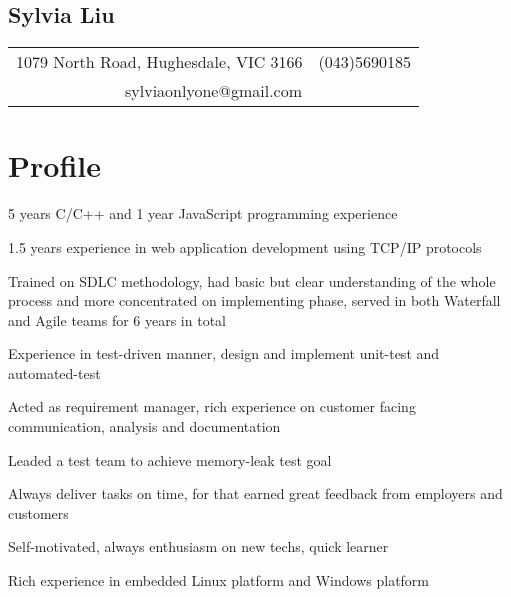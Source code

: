 \documentclass[a4paper,11pt]{article}
\begin{document}
\begin{comment}
This is cover letter field.
\end{comment}


\begin{center}
  \section*{Sylvia Liu}
  \begin{tabular}{l r}
    1079 North Road, Hughesdale, VIC 3166 & (043)5690185 \\
    \multicolumn{2}{c}{sylviaonlyone@gmail.com} \\
  \end{tabular}
\end{center}

\begin{comment}
\begin{tabular}{l l}
  Mobile:  & 0435690185 \\
  E-mail:  & sylviaonlyone@gmail.com \\
  Address: & Hughesdale, VIC 3166 \\
  \multicolumn{2}{l}{Australia Permanent Resident, 175 visa holder} \\
\end{tabular}
\end{comment}

\section*{Profile}
\begin{itemize*}
    \setlength\itemsep{0.4em}
  \item 5 years C/C++ and 1 year JavaScript programming experience
  \item 1.5 years experience in web application development using TCP/IP protocols
  \item Trained on SDLC methodology, had basic but clear understanding of the whole process and more concentrated on implementing phase, served in both Waterfall and Agile teams for 6 years in total
  \item Experience in test-driven manner, design and implement unit-test and automated-test
  \item Acted as requirement manager, rich experience on customer facing communication, analysis and documentation
  \item Leaded a test team to achieve memory-leak test goal
  \item Always deliver tasks on time, for that earned great feedback from employers and customers
  \item Self-motivated, always enthusiasm on new techs, quick learner
  \item Rich experience in embedded Linux platform and Windows platform
\end{itemize*}
\end{document}
